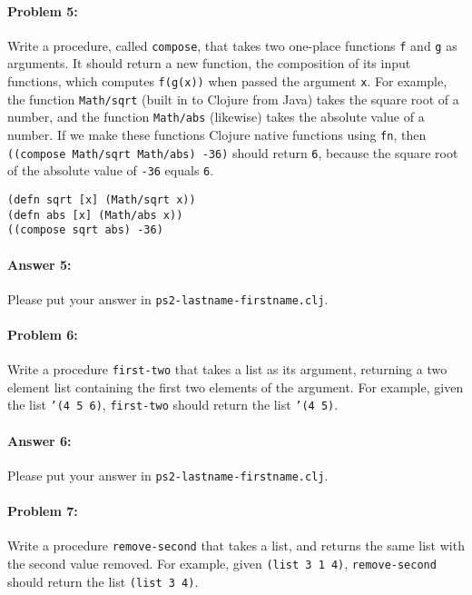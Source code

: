 \documentclass[10pt]{article}
\newcommand{\PSnum}{2}
\begin{document}
\noindent\hrulefill %

\paragraph{Problem 5:}
Write a procedure, called \texttt{compose}, that takes two one-place
functions \texttt{f} and \texttt{g} as arguments. It should return a
new function, the composition of its input functions, which computes
\texttt{f(g(x))} when passed the argument \texttt{x}. For example, the
function \texttt{Math/sqrt} (built in to Clojure from Java) takes the
square root of a number, and the function \texttt{Math/abs} (likewise) takes the absolute value of a number. If we make
these functions Clojure native functions using \texttt{fn}, then
\texttt{((compose Math/sqrt Math/abs) -36)} should return \texttt{6},
because the square root of the absolute value of \texttt{-36} equals
\texttt{6}.

\begin{lstlisting}
(defn sqrt [x] (Math/sqrt x))
(defn abs [x] (Math/abs x))
((compose sqrt abs) -36)
\end{lstlisting}

\paragraph{Answer 5:} Please put your answer in \texttt{ps\PSnum-lastname-firstname.clj}.

\noindent\hrulefill %

\paragraph{Problem 6:}
  Write a procedure \texttt{first-two} that takes a list as its argument,
  returning a two element list containing the first two elements of
  the argument. For example, given the list \texttt{'(4 5 6)},
  \texttt{first-two} should return the list \texttt{'(4 5)}.

\paragraph{Answer 6:} Please put your answer in \texttt{ps\PSnum-lastname-firstname.clj}.

\noindent\hrulefill %

\paragraph{Problem 7:}
Write a procedure \texttt{remove-second} that takes a list, and
returns the same list with the second value removed. For example,
given \texttt{(list 3 1 4)}, \texttt{remove-second} should return
the list \texttt{(list 3 4)}.
\end{document}
